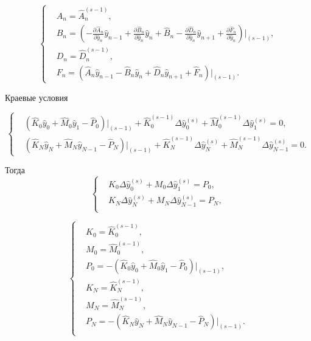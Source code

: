 \documentclass[a4paper,oneside,12pt]{extreport}
\begin{document}
\begin{enumerate}
	\begin{equation*}
		\left\{
		\begin{aligned}
			&A_n=\widehat A_n^{(s-1)},\\
			&B_n=\left(-\frac{\partial\widehat A_n}{\partial\widehat y_n}\widehat y_{n-1} + \frac{\partial\widehat B_n}{\partial\widehat y_n}\widehat y_n + \widehat B_n-\frac{\partial\widehat D_n}{\partial\widehat y_n}\widehat y_{n+1} + \frac{\partial\widehat F_n}{\partial\widehat y_n}\right)\bigg|_{(s-1)},\\
			&D_n=\widehat D_n^{(s-1)},\\
			&F_n=\left(\widehat A_n\widehat y_{n-1}-\widehat B_n\widehat y_n + \widehat D_n\widehat y_{n+1}+\widehat F_n\right)\bigg|_{(s-1)}.
		\end{aligned}
		\right.
	\end{equation*}

	Краевые условия

	\begin{equation*}
		\left\{
		\begin{aligned}
			&\left(\widehat K_0\widehat y_0+\widehat M_0\widehat y_1 - \widehat P_0\right)\bigg|_{(s-1)} + \widehat K_0^{(s-1)}\Delta\widehat y_{0}^{(s)}+\widehat M_0^{(s-1)}\Delta\widehat y_{1}^{(s)}=0,\\
			&\left(\widehat K_N\widehat y_N+\widehat M_N\widehat y_{N-1}- \widehat P_N\right)\bigg|_{(s-1)}+\widehat K_N^{(s-1)}\Delta\widehat y_{N}^{(s)}+\widehat M_N^{(s-1)}\Delta\widehat y_{N-1}^{(s)}=0.
		\end{aligned}
		\right.
	\end{equation*}

	Тогда
	\begin{equation*}
		\left\{
		\begin{aligned}
			&K_0\Delta\widehat y_{0}^{(s)}+M_0\Delta\widehat y_{1}^{(s)}=P_0,\\
			&K_N\Delta\widehat y_{N}^{(s)}+M_N\Delta\widehat y_{N-1}^{(s)}=P_N,\\
		\end{aligned}
		\right.
	\end{equation*}

	\begin{equation*}
		\left\{
		\begin{aligned}
			&K_0=\widehat K_0^{(s-1)},\\
			&M_0=\widehat M_0^{(s-1)},\\
			&P_0=-\left(\widehat K_0 \widehat y_0+ \widehat M_0 \widehat y_1- \widehat P_0\right)\bigg|_{(s-1)},\\
			&K_N=\widehat K_N^{(s-1)},\\
			&M_N=\widehat M_N^{(s-1)},\\
			&P_N=-\left(\widehat K_N \widehat y_N+ \widehat M_N \widehat y_{N-1}-\widehat P_N\right)\bigg|_{(s-1)}.\\
		\end{aligned}
		\right.
	\end{equation*}


\end{enumerate}
\end{document}

